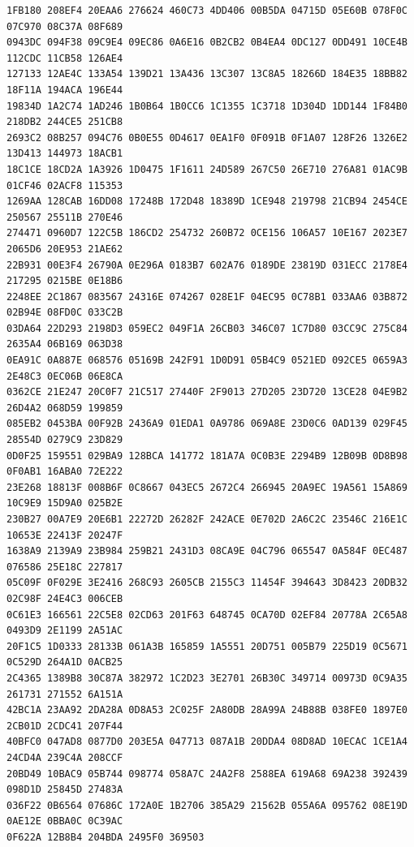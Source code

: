 \documentclass[11pt]{amsart}
\theoremstyle{remark}
\begin{document}
{\begin{verbatim}
1FB180 208EF4 20EAA6 276624 460C73 4DD406 00B5DA 04715D 05E60B 078F0C 07C970 08C37A 08F689
0943DC 094F38 09C9E4 09EC86 0A6E16 0B2CB2 0B4EA4 0DC127 0DD491 10CE4B 112CDC 11CB58 126AE4
127133 12AE4C 133A54 139D21 13A436 13C307 13C8A5 18266D 184E35 18BB82 18F11A 194ACA 196E44
19834D 1A2C74 1AD246 1B0B64 1B0CC6 1C1355 1C3718 1D304D 1DD144 1F84B0 218DB2 244CE5 251CB8
2693C2 08B257 094C76 0B0E55 0D4617 0EA1F0 0F091B 0F1A07 128F26 1326E2 13D413 144973 18ACB1
18C1CE 18CD2A 1A3926 1D0475 1F1611 24D589 267C50 26E710 276A81 01AC9B 01CF46 02ACF8 115353
1269AA 128CAB 16DD08 17248B 172D48 18389D 1CE948 219798 21CB94 2454CE 250567 25511B 270E46
274471 0960D7 122C5B 186CD2 254732 260B72 0CE156 106A57 10E167 2023E7 2065D6 20E953 21AE62
22B931 00E3F4 26790A 0E296A 0183B7 602A76 0189DE 23819D 031ECC 2178E4 217295 0215BE 0E18B6
2248EE 2C1867 083567 24316E 074267 028E1F 04EC95 0C78B1 033AA6 03B872 02B94E 08FD0C 033C2B
03DA64 22D293 2198D3 059EC2 049F1A 26CB03 346C07 1C7D80 03CC9C 275C84 2635A4 06B169 063D38
0EA91C 0A887E 068576 05169B 242F91 1D0D91 05B4C9 0521ED 092CE5 0659A3 2E48C3 0EC06B 06E8CA
0362CE 21E247 20C0F7 21C517 27440F 2F9013 27D205 23D720 13CE28 04E9B2 26D4A2 068D59 199859
085EB2 0453BA 00F92B 2436A9 01EDA1 0A9786 069A8E 23D0C6 0AD139 029F45 28554D 0279C9 23D829
0D0F25 159551 029BA9 128BCA 141772 181A7A 0C0B3E 2294B9 12B09B 0D8B98 0F0AB1 16ABA0 72E222
23E268 18813F 008B6F 0C8667 043EC5 2672C4 266945 20A9EC 19A561 15A869 10C9E9 15D9A0 025B2E
230B27 00A7E9 20E6B1 22272D 26282F 242ACE 0E702D 2A6C2C 23546C 216E1C 10653E 22413F 20247F
1638A9 2139A9 23B984 259B21 2431D3 08CA9E 04C796 065547 0A584F 0EC487 076586 25E18C 227817
05C09F 0F029E 3E2416 268C93 2605CB 2155C3 11454F 394643 3D8423 20DB32 02C98F 24E4C3 006CEB
0C61E3 166561 22C5E8 02CD63 201F63 648745 0CA70D 02EF84 20778A 2C65A8 0493D9 2E1199 2A51AC
20F1C5 1D0333 28133B 061A3B 165859 1A5551 20D751 005B79 225D19 0C5671 0C529D 264A1D 0ACB25
2C4365 1389B8 30C87A 382972 1C2D23 3E2701 26B30C 349714 00973D 0C9A35 261731 271552 6A151A
42BC1A 23AA92 2DA28A 0D8A53 2C025F 2A80DB 28A99A 24B88B 038FE0 1897E0 2CB01D 2CDC41 207F44
40BFC0 047AD8 0877D0 203E5A 047713 087A1B 20DDA4 08D8AD 10ECAC 1CE1A4 24CD4A 239C4A 208CCF
20BD49 10BAC9 05B744 098774 058A7C 24A2F8 2588EA 619A68 69A238 392439 098D1D 25845D 27483A
036F22 0B6564 07686C 172A0E 1B2706 385A29 21562B 055A6A 095762 08E19D 0AE12E 0BBA0C 0C39AC
0F622A 12B8B4 204BDA 2495F0 369503
\end{verbatim}
}
\end{document}
